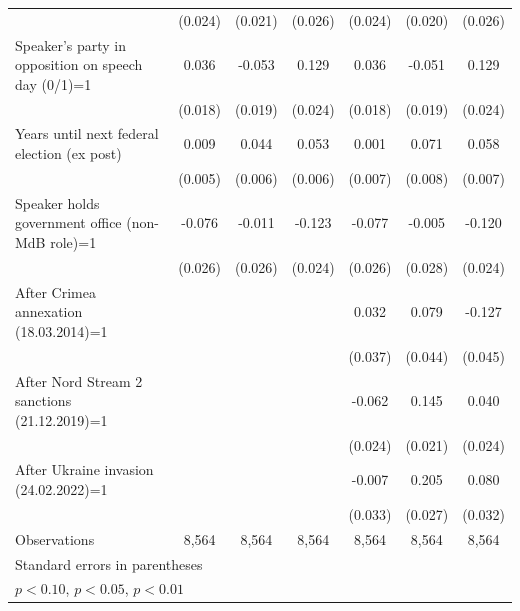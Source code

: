 \begin{table}[htbp]
\begin{tabular}{l*{6}{c}}
                    &     (0.024)         &     (0.021)         &     (0.026)         &     (0.024)         &     (0.020)         &     (0.026)         \\
\addlinespace
Speaker's party in opposition on speech day (0/1)=1&       0.036\sym{**} &      -0.053\sym{***}&       0.129\sym{***}&       0.036\sym{**} &      -0.051\sym{***}&       0.129\sym{***}\\
                    &     (0.018)         &     (0.019)         &     (0.024)         &     (0.018)         &     (0.019)         &     (0.024)         \\
\addlinespace
Years until next federal election (ex post)&       0.009\sym{*}  &       0.044\sym{***}&       0.053\sym{***}&       0.001         &       0.071\sym{***}&       0.058\sym{***}\\
                    &     (0.005)         &     (0.006)         &     (0.006)         &     (0.007)         &     (0.008)         &     (0.007)         \\
\addlinespace
Speaker holds government office (non-MdB role)=1&      -0.076\sym{***}&      -0.011         &      -0.123\sym{***}&      -0.077\sym{***}&      -0.005         &      -0.120\sym{***}\\
                    &     (0.026)         &     (0.026)         &     (0.024)         &     (0.026)         &     (0.028)         &     (0.024)         \\
\addlinespace
After Crimea annexation (18.03.2014)=1&                     &                     &                     &       0.032         &       0.079\sym{*}  &      -0.127\sym{***}\\
                    &                     &                     &                     &     (0.037)         &     (0.044)         &     (0.045)         \\
\addlinespace
After Nord Stream 2 sanctions (21.12.2019)=1&                     &                     &                     &      -0.062\sym{***}&       0.145\sym{***}&       0.040\sym{*}  \\
                    &                     &                     &                     &     (0.024)         &     (0.021)         &     (0.024)         \\
\addlinespace
After Ukraine invasion (24.02.2022)=1&                     &                     &                     &      -0.007         &       0.205\sym{***}&       0.080\sym{**} \\
                    &                     &                     &                     &     (0.033)         &     (0.027)         &     (0.032)         \\
\midrule
Observations        &       8,564         &       8,564         &       8,564         &       8,564         &       8,564         &       8,564         \\
\bottomrule
\multicolumn{7}{l}{\footnotesize Standard errors in parentheses}\\
\multicolumn{7}{l}{\footnotesize \sym{*} \(p<0.10\), \sym{**} \(p<0.05\), \sym{***} \(p<0.01\)}\\
\end{tabular}
\end{table}
